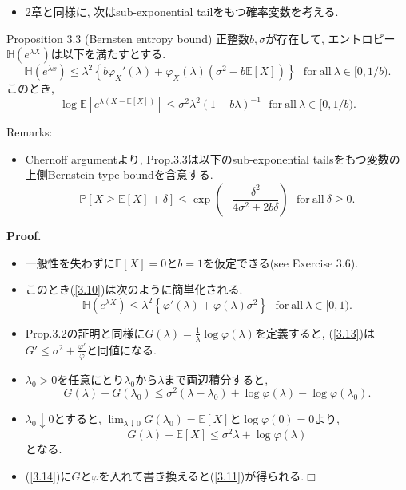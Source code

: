 \documentclass[aspectratio=169, dvipdfmx]{beamer}
\def\qed{\hfill $\Box$}
\newcommand{\ex}{\mathbb{E}}
\begin{document}
\begin{frame}{}
\begin{itemize}
    \item 2章と同様に, 次はsub-exponential tailをもつ確率変数を考える.
\end{itemize}
\begin{block}{Proposition 3.3 (Bernsten entropy bound)}
    正整数$b, \sigma$が存在して, エントロピー$\mathbb{H}(e^{\lambda X})$は以下を満たすとする.
    \[
        \mathbb{H}(e^{\lambda x})
        \le \lambda^2\left\{b\varphi_X'(\lambda) + \varphi_X(\lambda)(\sigma^2-b\ex[X])\right\}
        \ \ \ \mathrm{for\ all}\ \lambda \in [0, 1/b).
        \tag{3.10}\label{3.10}
    \]
    このとき, 
    \[
        \log\ex[e^{\lambda(X-\ex[X])}] \le \sigma^2\lambda^2(1-b\lambda)^{-1}
        \ \ \ \mathrm{for\ all}\ \lambda \in [0, 1/b).
        \tag{3.11}\label{3.11}
    \]
\end{block}
Remarks:
\begin{itemize}
    \item Chernoff argumentより, Prop.3.3は以下のsub-exponential tailsをもつ変数の上側Bernstein-type boundを含意する.
    \[
        \mathbb{P}[X\ge\ex[X] + \delta]
        \le \exp\left(-\frac{\delta^2}{4\sigma^2+2b\delta}\right)
        \ \ \ \mathrm{for\ all}\ \delta \ge 0.
        \tag{3.12}\label{3.12}
    \]
\end{itemize}
\end{frame}

\begin{frame}{}{}
{\bf Proof.}
\begin{itemize}
    \item 一般性を失わずに$\ex[X] = 0$と$b = 1$を仮定できる(see Exercise 3.6).
    \item このとき(\ref{3.10})は次のように簡単化される.
    \[
        \mathbb{H}(e^{\lambda X})
        \le \lambda^2 \left\{\varphi'(\lambda) + \varphi(\lambda)\sigma^2\right\}
        \ \ \ \mathrm{for\ all}\ \lambda \in [0,1).
        \tag{3.13}\label{3.13}
    \]
    \item Prop.3.2の証明と同様に$G(\lambda) = \frac{1}{\lambda}\log \varphi(\lambda)$を定義すると,
    (\ref{3.13})は$G' \le \sigma^2 + \frac{\varphi'}{\varphi}$と同値になる.
    \item $\lambda_0 > 0$を任意にとり$\lambda_0$から$\lambda$まで両辺積分すると,
    \[
        G(\lambda) - G(\lambda_0)
        \le \sigma^2(\lambda-\lambda_0) + \log\varphi(\lambda) - \log \varphi(\lambda_0).
    \]
    \item $\lambda_0 \downarrow 0$とすると,
    $\lim_{\lambda\downarrow 0}G(\lambda_0) = \ex[X]$と$\log\varphi(0)=0$より,
    \[
        G(\lambda) - \ex[X] \le \sigma^2 \lambda + \log\varphi(\lambda)
        \tag{3.14}\label{3.14}
    \]
    となる.
    \item (\ref{3.14})に$G$と$\varphi$を入れて書き換えると(\ref{3.11})が得られる.\qed
\end{itemize}
\end{frame}
\end{document}
